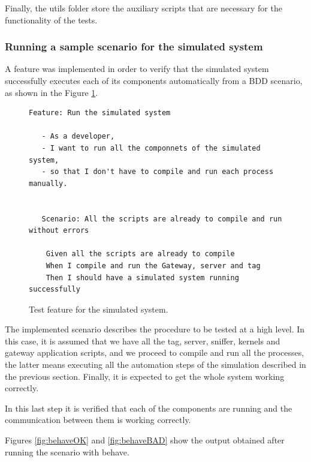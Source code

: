 \documentclass[journal]{IEEEtran}	%
\begin{document}
Finally, the utils folder store the auxiliary scripts that are necessary for the functionality of the tests.\\
\subsubsection{Running a sample scenario for the simulated system}

A feature was implemented in order to verify that the simulated system successfully executes each of its components automatically from a BDD scenario, as shown in the Figure \ref{fig:simsys}.

\begin{figure}[H]
\centering
\begin{lstlisting}[]
 Feature: Run the simulated system

   - As a developer,
   - I want to run all the componnets of the simulated system,
   - so that I don't have to compile and run each process manually.


   Scenario: All the scripts are already to compile and run without errors

    Given all the scripts are already to compile 
    When I compile and run the Gateway, server and tag
    Then I should have a simulated system running successfully
\end{lstlisting}
\caption{Test feature for the simulated system.}
\label{fig:simsys}
\end{figure}

The implemented scenario describes the procedure to be tested at a high level. In this case, it is assumed that we have all the tag, server, sniffer, kernels and gateway application scripts, and we proceed to compile and run all the processes, the latter means executing all the automation steps of the simulation described in the previous section. Finally, it is expected to get the whole system working correctly.

In this last step it is verified that each of the components are running and the communication between them is working correctly.

Figures \ref{fig:behaveOK} and \ref{fig:behaveBAD} show the output obtained after running the scenario with behave.
\end{document}
